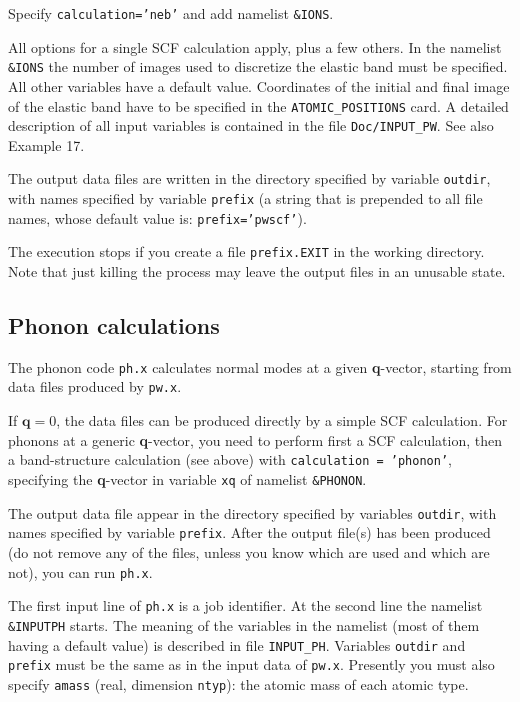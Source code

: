 \documentclass[12pt,a4paper]{article}
\begin{document}
\begin{description}
    \hfill Specify \texttt{calculation='neb'} and add namelist
    \texttt{\&IONS}.

    All options for a single SCF calculation apply, plus a few others.
    In the namelist \texttt{\&IONS} the number of images used to
    discretize the elastic band must be specified.  All other
    variables have a default value.  Coordinates of the initial and
    final image of the elastic band have to be specified in the
    \texttt{ATOMIC\_POSITIONS} card.  A detailed description of all
    input variables is contained in the file \texttt{Doc/INPUT\_PW}.
    See also Example 17.

\end{description}

The output data files are written in the directory specified by
variable \texttt{outdir}, with names specified by variable
\texttt{prefix} (a string that is prepended to all file names,
whose default value is: \texttt{prefix='pwscf'}).

The execution stops if you create a file \texttt{prefix.EXIT} in the
working directory. Note that just killing the process may leave the
output files in an unusable state.

\subsection{Phonon calculations}

The phonon code \texttt{ph.x} calculates normal modes at a given
\textbf{q}-vector, starting from data files produced by \texttt{pw.x}.

If $\mathbf{q}=0$, the data files can be produced directly by a simple
SCF calculation.
For phonons at a generic \textbf{q}-vector, you need to perform first
a SCF calculation, then a band-structure calculation (see above)
with
\texttt{calculation = 'phonon'}, specifying the \textbf{q}-vector
in variable \texttt{xq} of namelist \texttt{\&PHONON}.

The output data file appear in the directory specified by variables
\texttt{outdir}, with names specified by variable \texttt{prefix}.
After the output file(s) has been produced (do not remove any of the
files, unless you know which are used and which are not), you can run
\texttt{ph.x}.

The first input line of \texttt{ph.x} is a job identifier.
At the second line the namelist \texttt{\&INPUTPH} starts.
The meaning of the variables in the namelist (most of them having a
default value) is described in file \texttt{INPUT\_PH}.
Variables \texttt{outdir} and \texttt{prefix} must be the same as in
the input data of \texttt{pw.x}.
Presently you must also specify \texttt{amass} (real, dimension
\texttt{ntyp}): the atomic mass of each atomic type.
\end{document}
